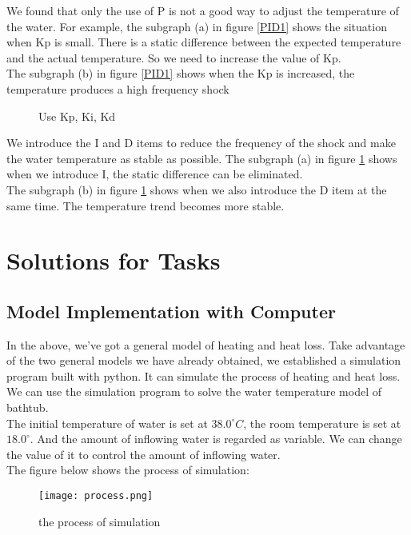 \documentclass{mcmthesis}
\begin{document}
\indent We found that only the use of P is not a good way to adjust the temperature of the water. For example, the subgraph (a) in figure \ref{PID1} shows the situation when Kp is small. There is a static difference between the expected temperature and the actual temperature. So we need to increase the value of Kp.\\
\indent The subgraph (b) in figure \ref{PID1} shows when the Kp is increased, the temperature produces a high frequency shock\\

\begin{figure}[H]
\centering
{}
\caption{Use Kp, Ki, Kd}
\label{PID2}
\end{figure}
\indent We introduce the I and D items to reduce the frequency of the shock and make the water temperature as stable as possible. The subgraph (a) in figure \ref{PID2} shows when we introduce I, the static difference can be eliminated. \\
\indent The subgraph (b) in figure \ref{PID2} shows when we also introduce the D item at the same time. The temperature trend becomes more stable.\\
\section{Solutions for Tasks}
\subsection{Model Implementation with Computer}
\indent In the above, we've got a general model of heating and heat loss. Take advantage of the two general models we have already obtained, we established a simulation program built with python. It can simulate the process of heating and heat loss. We can use the simulation program to solve the water temperature model of bathtub.\\
\indent The initial temperature of water is set at $38.0^{\circ}C$, the room temperature is set at $18.0^{\circ}$. And the amount of inflowing water is regarded as variable. We can change the value of it to control the amount of inflowing water.\\
\indent The figure below shows the process of simulation:
 \begin{figure}[H]
\centerline{\texttt{[image: process.png]}}
\caption{the process of simulation}                  %
\label{oval}	
\end{figure}
\end{document}
